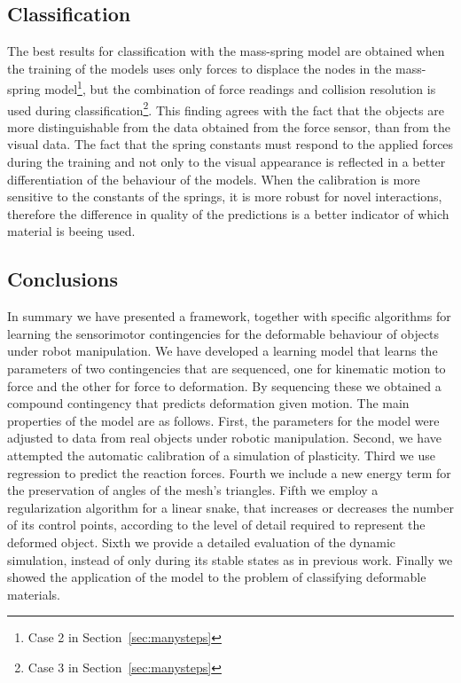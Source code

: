 \documentclass[journal]{IEEEtran}
\newcommand{\sref}[1]{Section~\ref{#1}}
\newcounter{algorithm}
\begin{document}
\subsection{Classification}
The best results for classification with the mass-spring model are obtained when the training of the models uses only forces to displace the nodes in the mass-spring model\footnote{Case 2 in \sref{sec:manysteps}}, but the combination of force readings and collision resolution is used during classification\footnote{Case 3 in \sref{sec:manysteps}}.  This finding agrees with the fact that the objects are more distinguishable from the data obtained from the force sensor, than from the visual data.  The fact that the spring constants must respond to the applied forces during the training and not only to the visual appearance is reflected in a better differentiation of the behaviour of the models.  When the calibration is more sensitive to the constants of the springs, it is more robust for novel interactions, therefore the difference in quality of the predictions is a better indicator of which material is beeing used.

\subsection{Conclusions}
In summary we have presented a framework, together with specific algorithms for learning the sensorimotor contingencies for the deformable behaviour of objects under robot manipulation. We have developed a learning model that learns the parameters of two contingencies that are sequenced, one for kinematic motion to force and the other for force to deformation. By sequencing these we obtained a compound contingency that predicts deformation given motion. The main properties of the model are as follows. First, the parameters for the model were adjusted to data from real objects under robotic manipulation. Second, we have attempted the automatic calibration of a simulation of plasticity. Third we use regression to predict the reaction forces. Fourth we include a new energy term for the preservation of angles of the mesh's triangles. Fifth we employ a regularization algorithm for a linear snake, that increases or decreases the number of its control points, according to the level of detail required to represent the deformed object. Sixth we provide a detailed evaluation of the dynamic simulation, instead of only during its stable states as in previous work. Finally we showed the application of the model to the problem of classifying deformable materials.
\end{document}
